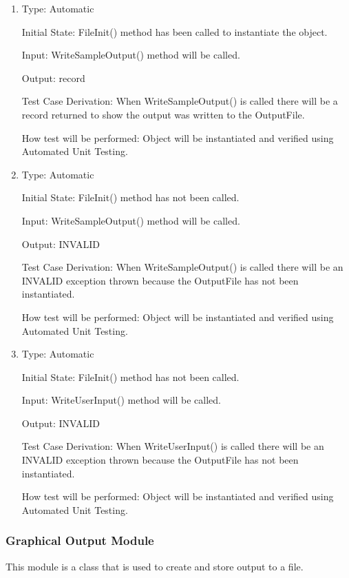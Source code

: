 \documentclass[12pt, titlepage]{article}
\begin{document}
\begin{enumerate}[{UT-FO}1.]
\item

Type: Automatic
					
Initial State: FileInit() method has been called to instantiate the object.
					
Input: WriteSampleOutput() method will be called.
					
Output: record

Test Case Derivation: When WriteSampleOutput() is called there will be a record returned to show the output was written to the OutputFile.

How test will be performed: Object will be instantiated and verified using Automated Unit Testing.

\item

Type: Automatic
					
Initial State:  FileInit() method has not been called.
					
Input: WriteSampleOutput() method will be called.
					
Output: INVALID

Test Case Derivation: When WriteSampleOutput() is called there will be an INVALID exception thrown because the OutputFile has not been instantiated.

How test will be performed: Object will be instantiated and verified using Automated Unit Testing.

\item

Type: Automatic
					
Initial State:  FileInit() method has not been called.
					
Input: WriteUserInput() method will be called.
					
Output: INVALID

Test Case Derivation: When WriteUserInput() is called there will be an INVALID exception thrown because the OutputFile has not been instantiated.

How test will be performed: Object will be instantiated and verified using Automated Unit Testing.

\end{enumerate}

\subsubsection{Graphical Output Module}

This module is a class that is used to create and store output to a file.
\end{document}
